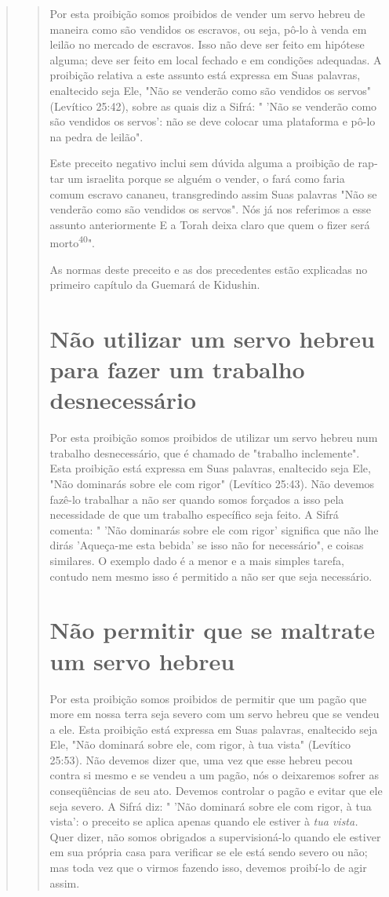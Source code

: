 \begin{quote}
\begin{quote}
Por esta proibição somos proibidos de vender um servo hebreu de maneira
como são vendidos os escravos, ou seja, pô-lo à venda em leilão no
mercado de escravos. Isso não deve ser feito em hipótese alguma; deve
ser fei­to em local fechado e em condições adequadas. A proibição
relativa a este as­sunto está expressa em Suas palavras, enaltecido seja
Ele, "Não se venderão co­mo são vendidos os servos" (Levítico 25:42),
sobre as quais diz a Sifrá: " 'Não se venderão como são vendidos os
servos': não se deve colocar uma platafor­ma e pô-lo na pedra de
leilão".

Este preceito negativo inclui sem dúvida alguma a proibição de rap­tar
um israelita porque se alguém o vender, o fará como faria comum escravo
cananeu, transgredindo assim Suas palavras "Não se venderão como são
vendi­dos os servos". Nós já nos referimos a esse assunto anteriormente
E a Torah deixa claro que quem o fizer será morto\textsuperscript{40}".

As normas deste preceito e as dos precedentes estão explicadas no
primeiro capítulo da Guemará de Kidushin.

\section{Não utilizar um servo hebreu para fazer um trabalho desnecessário}

Por esta proibição somos proibidos de utilizar um servo hebreu num
trabalho desnecessário, que é chamado de "trabalho inclemente". Esta
proibi­ção está expressa em Suas palavras, enaltecido seja Ele, "Não
dominarás sobre ele com rigor" (Levítico 25:43). Não devemos fazê-lo
trabalhar a não ser quan­do somos forçados a isso pela necessidade de
que um trabalho específico seja feito. A Sifrá comenta: " 'Não dominarás
sobre ele com rigor' significa que não lhe dirás 'Aqueça-me esta bebida'
se isso não for necessário", e coisas similares. O exemplo dado é a
menor e a mais simples tarefa, contudo nem mesmo isso é permitido a não
ser que seja necessário.

\section{Não permitir que se maltrate um servo hebreu}

Por esta proibição somos proibidos de permitir que um pagão que more em
nossa terra seja severo com um servo hebreu que se vendeu a ele. Esta
proibição está expressa em Suas palavras, enaltecido seja Ele, "Não
domi­nará sobre ele, com rigor, à tua vista" (Levítico 25:53). Não
devemos dizer que, uma vez que esse hebreu pecou contra si mesmo e se
vendeu a um pagão, nós o deixaremos sofrer as conseqüências de seu ato.
Devemos controlar o pagão e evitar que ele seja severo. A Sifrá diz: "
'Não dominará sobre ele com rigor, à tua vista': o preceito se aplica
apenas quando ele estiver à \emph{tua vista.} Quer dizer, não somos
obrigados a supervisioná-lo quando ele estiver em sua pró­pria casa para
verificar se ele está sendo severo ou não; mas toda vez que o virmos
fazendo isso, devemos proibí-lo de agir assim.
\end{quote}


\end{quote}
